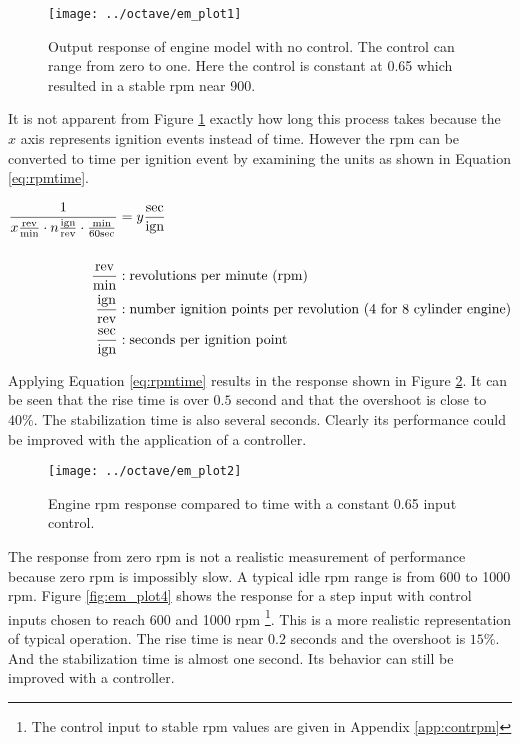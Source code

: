 \documentclass{article}
\begin{document}
\begin{figure}[htbp!]
\begin{center}
\texttt{[image: ../octave/em\_plot1]}
\end{center}
\caption{Output response of engine model with no control.
The control can range from zero to one.
Here the control is constant at 0.65 which resulted in a stable
rpm near 900.}
\label{fig:em_plot}
\end{figure}

It is not apparent from Figure \ref{fig:em_plot} exactly how long
this process takes because the $x$ axis represents ignition events
instead of time.
However the rpm can be converted to time per ignition event by examining
the units as shown in Equation \ref{eq:rpmtime}.

\begin{align}
\frac{1}{x \frac{\text{rev}}{\text{min}}
			\cdot n \frac{\text{ign}}{\text{rev}}
			\cdot \frac{\text{min}}{60\text{sec}}
		}
&= y \frac{\text{sec}}{\text{ign}} \label{eq:rpmtime} \\
& \notag \\
	\frac{\text{rev}}{\text{min}} &: \text{revolutions per minute (rpm)} \notag \\
	\frac{\text{ign}}{\text{rev}} &: \text{number ignition points per revolution (4 for 8 cylinder engine)} \notag \\
	\frac{\text{sec}}{\text{ign}} &: \text{seconds per ignition point} \notag
\end{align}

Applying Equation \ref{eq:rpmtime} results in the response shown
in Figure \ref{fig:rpmtime_plot}.
It can be seen that the rise time is over $0.5$ second and
that the overshoot is close to $40\%$.
The stabilization time is also several seconds.
Clearly its performance could be improved with the application
of a controller.

\begin{figure}[htbp!]
\begin{center}
\texttt{[image: ../octave/em\_plot2]}
\end{center}
\caption{Engine rpm response compared to time with a constant
0.65 input control.}
\label{fig:rpmtime_plot}
\end{figure}

The response from zero rpm is not a realistic measurement of performance
because zero rpm is impossibly slow.
A typical idle rpm range is from 600 to 1000 rpm.
Figure \ref{fig:em_plot4} shows the response for a step input
with control inputs chosen to reach 600 and 1000 rpm
\footnote{The control input to stable rpm values are given in
Appendix \ref{app:contrpm}}.
This is a more realistic representation of typical operation.
The rise time is near $0.2$ seconds and the overshoot is $15\%$.
And the stabilization time is almost one second.
Its behavior can still be improved with a controller.
\end{document}
